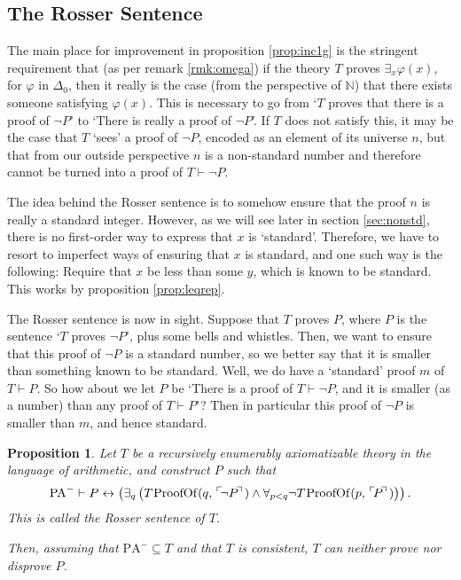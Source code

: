 \documentclass{article}
\newtheorem{prop}[theorem]{Proposition}
\theoremstyle{nonumberplain}
\newcommand{\N}{\mathbb{N}}
\newcommand{\PA}{\mathrm{PA}}
\newcommand{\WPA}{\PA^-}
\DeclareMathOperator{\ProofOf}{\mspace{-2mu}ProofOf}
\newcommand{\gn}[1]{\setbox0=\hbox{$\mathclap{\phantom{t}}#1$} \dimen0=\ht0 \advance\dimen0 by -1.25ex \,\raise\dimen0\hbox{$\ulcorner$} \! \box0 \! \raise\dimen0\hbox{$\urcorner$}\,}
\begin{document}
\subsection{The Rosser Sentence}\label{sec:rosser}

The main place for improvement in proposition \ref{prop:inc1g} is the stringent requirement that (as per remark \ref{rmk:omega}) if the theory $T$ proves $\exists_x \varphi(x)$, for $\varphi$ in $\Delta_0$, then it really is the case (from the perspective of $\N$) that there exists someone satisfying $\varphi(x)$. This is necessary to go from `$T$ proves that there is a proof of $\neg P$' to `There is really a proof of $\neg P$'. If $T$ does not satisfy this, it may be the case that $T$ `sees' a proof of $\neg P$, encoded as an element of its universe $n$, but that from our outside perspective $n$ is a non-standard number and therefore cannot be turned into a proof of $T \vdash \neg P$.

The idea behind the Rosser sentence is to somehow ensure that the proof $n$ is really a standard integer. However, as we will see later in section \ref{sec:nonstd}, there is no first-order way to express that $x$ is `standard'. Therefore, we have to resort to imperfect ways of ensuring that $x$ is standard, and one such way is the following: Require that $x$ be less than some $y$, which is known to be standard. This works by proposition \ref{prop:leqrep}.

The Rosser sentence is now in sight. Suppose that $T$ proves $P$, where $P$ is the sentence `$T$ proves $\neg P$', plus some bells and whistles. Then, we want to ensure that this proof of $\neg P$ is a standard number, so we better say that it is smaller than something known to be standard. Well, we do have a `standard' proof $m$ of $T \vdash P$. So how about we let $P$ be `There is a proof of $T \vdash \neg P$, and it is smaller (as a number) than any proof of $T \vdash P$'? Then in particular this proof of $\neg P$ is smaller than $m$, and hence standard.

\begin{prop}\label{prop:inc1r}
Let $T$ be a recursively enumerably axiomatizable theory in the language of arithmetic, and construct $P$ such that
\begin{equation}
\WPA \vdash P \leftrightarrow \left(\exists_q \left(T\ProofOf(q,\gn{\neg P}) \land \forall_{p<q} \neg T\ProofOf(p, \gn P) \right) \right).
\end{equation}
This is called \emph{the Rosser sentence of $T$}.

Then, assuming that $\WPA \subseteq T$ and that $T$ is consistent, $T$ can neither prove nor disprove $P$.
\end{prop}
\end{document}
